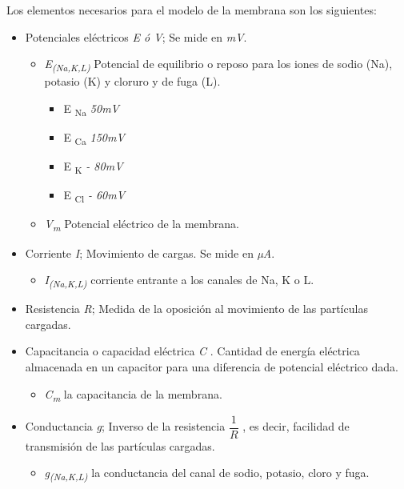 Los elementos necesarios para el modelo de la membrana son los siguientes:
\begin{itemize}
\item Potenciales eléctricos \emph{E ó  V}; Se mide en \emph{mV}.
    \begin{itemize}
     \item \emph{E\textsubscript{(Na,K,L)}} 
     Potencial de equilibrio o reposo para los iones de sodio (Na), potasio (K) y cloruro y de fuga (L). 
     \begin{itemize}
        \item E \textsubscript{Na}  \emph{50mV}
        \item E \textsubscript{Ca}  \emph{150mV}
        \item E \textsubscript{K}   \emph{- 80mV}
        \item E \textsubscript{Cl}  \emph{- 60mV}
        \end{itemize}

     \item \emph{V\textsubscript{m}} Potencial eléctrico de la membrana. 
     \end{itemize}

\item Corriente \emph{I}; Movimiento de cargas. Se mide en \emph{µA}.
    \begin{itemize}
     \item \emph{I\textsubscript{(Na,K,L)}} corriente entrante a los canales de Na, K o L.
     \end{itemize}

\item Resistencia \emph{R}; Medida de la oposición al movimiento de las partículas cargadas.
\item Capacitancia o capacidad eléctrica \emph{C} . Cantidad de energía eléctrica almacenada en un capacitor para una diferencia de potencial eléctrico dada.
    \begin{itemize}
     \item \emph{C\textsubscript{m}} la capacitancia de la membrana. 
     \end{itemize}

\item Conductancia \emph{g}; Inverso de la resistencia \( \dfrac{1}{R} \) , es decir, facilidad de transmisión de las partículas cargadas.
    \begin{itemize}
     \item \emph{g\textsubscript{(Na,K,L)}}  la conductancia del canal de sodio, potasio, cloro y fuga. 
     \end{itemize}

\end{itemize}

